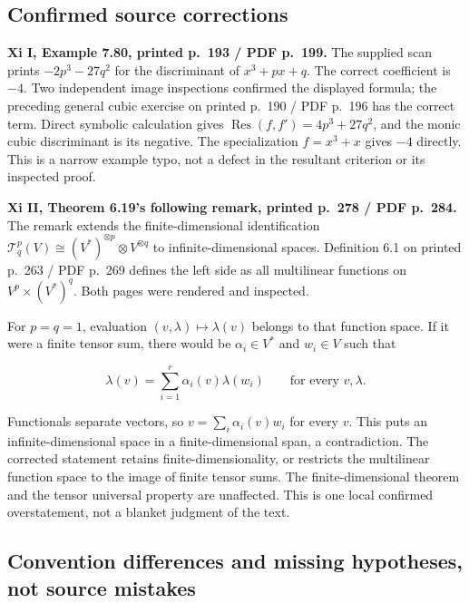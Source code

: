 \documentclass[
  11pt,
]{article}
\begin{document}
\subsection{Confirmed source
corrections}\label{confirmed-source-corrections}

\textbf{Xi I, Example 7.80, printed p.~193 / PDF p.~199.} The supplied
scan prints \(-2p^3-27q^2\) for the discriminant of \(x^3+px+q\). The
correct coefficient is \(-4\). Two independent image inspections
confirmed the displayed formula; the preceding general cubic exercise on
printed p.~190 / PDF p.~196 has the correct term. Direct symbolic
calculation gives \(\operatorname{Res}(f,f')=4p^3+27q^2\), and the monic
cubic discriminant is its negative. The specialization \(f=x^3+x\) gives
\(-4\) directly. This is a narrow example typo, not a defect in the
resultant criterion or its inspected proof.

\textbf{Xi II, Theorem 6.19's following remark, printed p.~278 / PDF
p.~284.} The remark extends the finite-dimensional identification
\(\mathcal T_q^p(V)\cong(V^*)^{\otimes p}\otimes V^{\otimes q}\) to
infinite-dimensional spaces. Definition 6.1 on printed p.~263 / PDF
p.~269 defines the left side as all multilinear functions on
\(V^p\times(V^*)^q\). Both pages were rendered and inspected.

For \(p=q=1\), evaluation \((v,\lambda)\mapsto\lambda(v)\) belongs to
that function space. If it were a finite tensor sum, there would be
\(\alpha_i\in V^*\) and \(w_i\in V\) such that

\[\lambda(v)=\sum_{i=1}^r\alpha_i(v)\lambda(w_i)
\qquad\text{for every }v,\lambda.\]

Functionals separate vectors, so \(v=\sum_i\alpha_i(v)w_i\) for every
\(v\). This puts an infinite-dimensional space in a finite-dimensional
span, a contradiction. The corrected statement retains
finite-dimensionality, or restricts the multilinear function space to
the image of finite tensor sums. The finite-dimensional theorem and the
tensor universal property are unaffected. This is one local confirmed
overstatement, not a blanket judgment of the text.

\subsection{Convention differences and missing hypotheses, not source
mistakes}\label{convention-differences-and-missing-hypotheses-not-source-mistakes}
\end{document}
